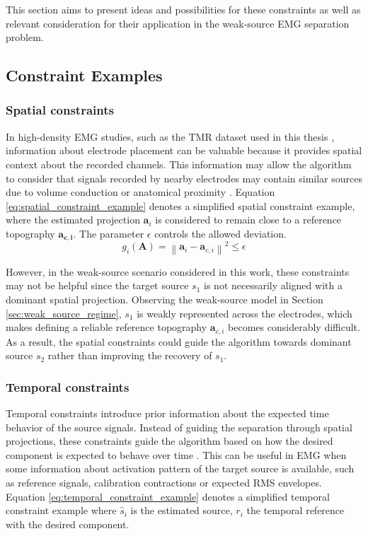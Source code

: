 This section aims to present ideas and possibilities for these constraints as well as relevant consideration for their application in the weak-source EMG separation problem.

\subsection{Constraint Examples}
\subsubsection{Spatial constraints}

In high-density EMG studies, such as the TMR dataset used in this thesis \cite{todd_kuiken_electromyography_2023}, information about electrode placement can be valuable because it provides spatial context about the recorded channels. This information may allow the algorithm to consider that signals recorded by nearby electrodes may contain similar sources due to volume conduction or anatomical proximity \cite{hesse_fastica_2005}. Equation \ref{eq:spatial_constraint_example} denotes a simplified spatial constraint example, where the estimated projection $\mathbf{a}_i$ is considered to remain close to a reference topography $\mathbf{a_{c,i}}$. The parameter $\epsilon$ controls the allowed deviation. 
\begin{equation}
    g_i(\mathbf{A})
    =
    \left\|
    \mathbf{a}_i - \mathbf{a}_{c,i}
    \right\|^2
    \leq \epsilon
    \label{eq:spatial_constraint_example}
\end{equation}

However, in the weak-source scenario considered in this work, these constraints may not be helpful since the target source $s_1$ is not necessarily aligned with a dominant spatial projection. Observing the weak-source model in Section \ref{sec:weak_source_regime}, $s_1$ is weakly represented across the electrodes,  which makes defining a reliable reference topography $\mathbf{a}_{c,i}$ becomes considerably difficult. As a result, the spatial constraints could guide the algorithm towards dominant source $s_2$ rather than improving the recovery of $s_1$.

\subsubsection{Temporal constraints}
Temporal constraints introduce prior information about the expected time behavior of the source signals. Instead of guiding the separation through spatial projections, these constraints guide the algorithm based on how the desired component is expected to behave over time \cite{yang_flexible_2025,lu_ica_2006}. This can be useful in EMG when some information about activation pattern of the target source is available, such as reference signals, calibration contractions or expected RMS envelopes. Equation \ref{eq:temporal_constraint_example} denotes a simplified temporal constraint example where $\hat{s}_i$ is the estimated source, $r_i$ the temporal reference with the desired component.

